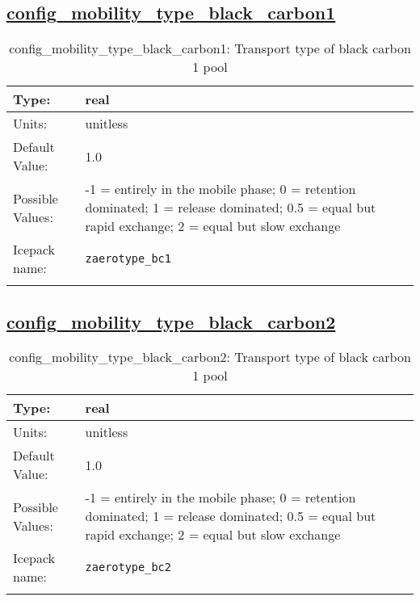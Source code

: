 \subsection[config\_mobility\_type\_black\_carbon1]{\hyperref[sec:nm_tab_biogeochemistry]{config\_mobility\_type\_black\_carbon1}}
\label{subsec:nm_sec_config_mobility_type_black_carbon1}
\begin{center}
\begin{longtable}{| p{2.0in} || p{4.0in} |}
    \hline
    Type: & real \\
    \hline
    Units: & \si{unitless} \\
    \hline
    Default Value: & 1.0 \\
    \hline
    Possible Values: & -1 = entirely in the mobile phase; 0 = retention dominated; 1 = release dominated; 0.5 = equal but rapid exchange; 2 = equal but slow exchange \\
    \hline
    Icepack name: & \verb+zaerotype_bc1+ \\
    \hline
    \caption{config\_mobility\_type\_black\_carbon1: Transport type of black carbon 1 pool}
\end{longtable}
\end{center}
\subsection[config\_mobility\_type\_black\_carbon2]{\hyperref[sec:nm_tab_biogeochemistry]{config\_mobility\_type\_black\_carbon2}}
\label{subsec:nm_sec_config_mobility_type_black_carbon2}
\begin{center}
\begin{longtable}{| p{2.0in} || p{4.0in} |}
    \hline
    Type: & real \\
    \hline
    Units: & \si{unitless} \\
    \hline
    Default Value: & 1.0 \\
    \hline
    Possible Values: & -1 = entirely in the mobile phase; 0 = retention dominated; 1 = release dominated; 0.5 = equal but rapid exchange; 2 = equal but slow exchange \\
    \hline
    Icepack name: & \verb+zaerotype_bc2+ \\
    \hline
    \caption{config\_mobility\_type\_black\_carbon2: Transport type of black carbon 1 pool}
\end{longtable}
\end{center}
